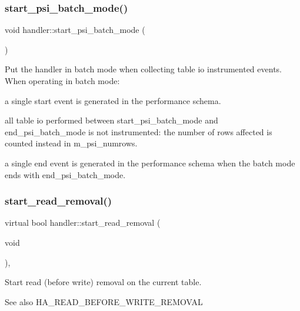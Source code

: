 \subsubsection{\texorpdfstring{start\+\_\+psi\+\_\+batch\+\_\+mode()}{start\_psi\_batch\_mode()}}
{\footnotesize\ttfamily void handler\+::start\+\_\+psi\+\_\+batch\+\_\+mode (\begin{DoxyParamCaption}{ }\end{DoxyParamCaption})}

Put the handler in \textquotesingle{}batch\textquotesingle{} mode when collecting table io instrumented events. When operating in batch mode\+:
\begin{DoxyItemize}
\item a single start event is generated in the performance schema.
\item all table io performed between {\ttfamily start\+\_\+psi\+\_\+batch\+\_\+mode} and {\ttfamily end\+\_\+psi\+\_\+batch\+\_\+mode} is not instrumented\+: the number of rows affected is counted instead in {\ttfamily m\+\_\+psi\+\_\+numrows}.
\item a single end event is generated in the performance schema when the batch mode ends with {\ttfamily end\+\_\+psi\+\_\+batch\+\_\+mode}. 
\end{DoxyItemize}\mbox{\label{classhandler_a3e2428788c2437e4e33c4b390cc697f7}} 
\subsubsection{\texorpdfstring{start\+\_\+read\+\_\+removal()}{start\_read\_removal()}}
{\footnotesize\ttfamily virtual bool handler\+::start\+\_\+read\+\_\+removal (\begin{DoxyParamCaption}\item[{void}]{ }\end{DoxyParamCaption})\hspace{0.3cm}{\ttfamily [inline]}, {\ttfamily [virtual]}}

Start read (before write) removal on the current table. \begin{DoxySeeAlso}{See also}
H\+A\+\_\+\+R\+E\+A\+D\+\_\+\+B\+E\+F\+O\+R\+E\+\_\+\+W\+R\+I\+T\+E\+\_\+\+R\+E\+M\+O\+V\+AL 
\end{DoxySeeAlso}



